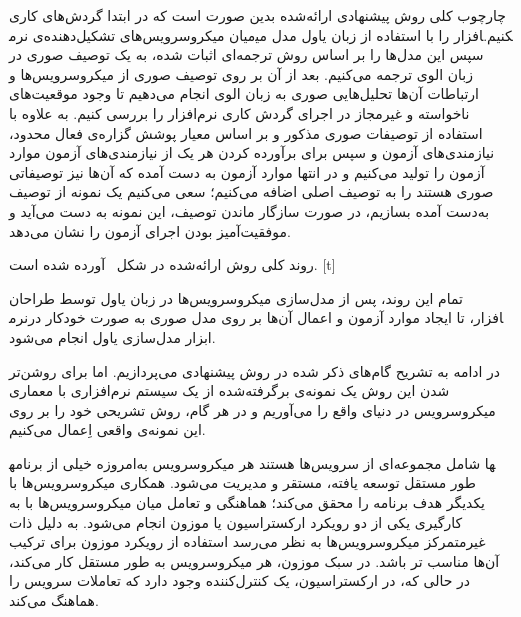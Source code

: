 
\label{فصل:روش پیشنهادی}

\label{قسمت:چارچوب کلی}
چارچوب کلی روش پیشنهادی ارائه‌شده بدین صورت است که در ابتدا گردش‌های کاری میان میکروسرویس‌های تشکیل‌دهنده‌ی نرم‎افزار را با استفاده از زبان یاول مدل می‎کنیم. سپس این مدل‌ها را بر اساس روش ترجمه‌ای اثبات شده، به یک توصیف صوری در زبان الوی ترجمه می‌کنیم. بعد از آن بر روی توصیف صوری از میکروسرویس‌ها و ارتباطات آن‌ها تحلیل‌هایی صوری به زبان الوی انجام می‌دهیم تا وجود موقعیت‌های ناخواسته و غیرمجاز در اجرای گردش کاری نرم‌افزار را بررسی کنیم. به علاوه با استفاده از توصیفات صوری مذکور و بر اساس معیار پوشش گزاره‌ی فعال محدود، نیازمندی‌های آزمون و سپس برای برآورده کردن هر یک از نیازمندی‌های آزمون موارد آزمون را تولید می‌کنیم و در انتها موارد آزمون به دست آمده که آن‌ها نیز توصیفاتی صوری هستند را به توصیف اصلی اضافه می‌کنیم؛ سعی می‌کنیم یک نمونه از توصیف به‌دست آمده بسازیم، در صورت سازگار ماندن توصیف، این نمونه به دست می‌آید و موفقیت‌آمیز بودن اجرای آزمون را نشان می‌دهد. 

روند کلی روش ارائه‌شده در شکل~ آورده شده است.
[t]
\vspace{0.3em}

تمام این روند، پس از مدل‌سازی میکروسرویس‌ها در زبان یاول توسط طراحان نرم‎افزار، تا ایجاد موارد آزمون و اعمال آن‌ها بر روی مدل صوری به صورت خودکار در ابزار مدل‌سازی یاول انجام می‌شود.

در ادامه به تشریح گام‌های ذکر شده در روش پیشنهادی می‌پردازیم. اما برای روشن‌تر شدن این روش یک نمونه‌‌ی برگرفته‌شده از یک سیستم نرم‌افزاری با معماری میکروسرویس در دنیای واقع را می‌آوریم و در هر گام، روش تشریحی خود را بر روی این نمونه‌ی واقعی اِعمال می‌کنیم. 




امروزه خیلی از برنامه‎ها شامل مجموعه‌ای از سرویس‌ها هستند هر میکروسرویس به طور مستقل توسعه یافته، مستقر و مدیریت می‌شود. 
همکاری میکروسرویس‌ها با یکدیگر هدف برنامه را محقق می‌کند؛ هماهنگی و تعامل میان میکروسرویس‌ها با به کارگیری یکی از دو رویکرد ارکستراسیون یا  موزون انجام می‌شود.
به دلیل ذات غیرمتمرکز میکروسرویس‌ها به نظر می‌رسد استفاده از رویکرد موزون برای ترکیب آن‌ها مناسب تر باشد. 
در سبک موزون، هر میکروسرویس به طور مستقل کار می‌کند، در حالی که، در ارکستراسیون، یک کنترل‌کننده وجود دارد که تعاملات سرویس را هماهنگ می‌کند.

